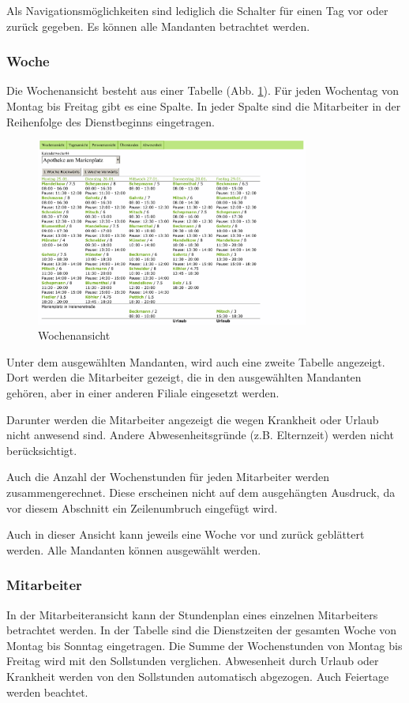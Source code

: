 \documentclass[10pt,a4paper,titlepage,oneside]{article}
\begin{document}
Als Navigationsmöglichkeiten sind lediglich die Schalter für einen Tag vor oder zurück gegeben. Es können alle Mandanten betrachtet werden.





\subsubsection{Woche}
Die Wochenansicht besteht aus einer Tabelle (Abb. \ref{fig:Wochenansicht}).
Für jeden Wochentag von Montag bis Freitag gibt es eine Spalte. In jeder Spalte sind die Mitarbeiter in der Reihenfolge des Dienstbeginns eingetragen.
\begin{figure}[h]
\centering
\includegraphics[width=0.8\textwidth]{woche-out}
\caption{Wochenansicht}
\label{fig:Wochenansicht}
\end{figure}

Unter dem ausgewählten Mandanten, wird auch eine zweite Tabelle angezeigt. Dort werden die Mitarbeiter gezeigt, die in den ausgewählten Mandanten gehören, aber in einer anderen Filiale eingesetzt werden.

Darunter werden die Mitarbeiter angezeigt die wegen Krankheit oder Urlaub nicht anwesend sind. Andere Abwesenheitsgründe (z.B. Elternzeit) werden nicht berücksichtigt.

Auch die Anzahl der Wochenstunden für jeden Mitarbeiter werden zusammengerechnet. Diese erscheinen nicht auf dem ausgehängten Ausdruck, da vor diesem Abschnitt ein Zeilenumbruch eingefügt wird.

Auch in dieser Ansicht kann jeweils eine Woche vor und zurück geblättert werden. Alle Mandanten können ausgewählt werden.





\subsubsection{Mitarbeiter}
In der Mitarbeiteransicht kann der Stundenplan eines einzelnen Mitarbeiters betrachtet werden.
In der Tabelle sind die Dienstzeiten der gesamten Woche von Montag bis Sonntag eingetragen.
Die Summe der Wochenstunden von Montag bis Freitag wird mit den Sollstunden verglichen. Abwesenheit durch Urlaub oder Krankheit werden von den Sollstunden automatisch abgezogen. Auch Feiertage werden beachtet.
\end{document}
